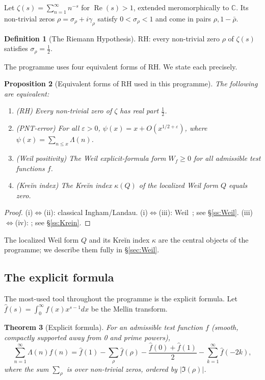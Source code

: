 \documentclass[11pt]{amsart}
\newtheorem{theorem}{Theorem}[section]
\newtheorem{proposition}[theorem]{Proposition}
\theoremstyle{definition}
\newtheorem{definition}[theorem]{Definition}
\theoremstyle{remark}
\newcommand{\RH}{\mathrm{RH}}
\renewcommand{\Re}{\operatorname{Re}}
\newcommand{\half}{\tfrac{1}{2}}
\newcommand{\kap}{\kappa}
\newcommand{\sig}{\sigma}
\newcommand{\gam}{\gamma}
\newcommand{\Lam}{\Lambda}
\newcommand{\eps}{\varepsilon}
\begin{document}
Let $\zeta(s) = \sum_{n=1}^\infty n^{-s}$ for $\Re(s)>1$, extended meromorphically to
$\mathbb{C}$.  Its non-trivial zeros $\rho = \sig_\rho + i\gam_\rho$ satisfy
$0 < \sig_\rho < 1$ and come in pairs $\rho, 1-\bar\rho$.

\begin{definition}[The Riemann Hypothesis]
$\RH$: every non-trivial zero $\rho$ of $\zeta(s)$ satisfies $\sig_\rho = \half$.
\end{definition}

The programme uses four equivalent forms of RH.  We state each precisely.

\begin{proposition}[Equivalent forms of RH used in this programme]
\label{prop:RH-equiv}
The following are equivalent:
\begin{enumerate}[label=\upshape(\roman*)]
  \item \textup{(RH)} Every non-trivial zero of $\zeta$ has real part $\half$.
  \item \textup{(PNT-error)} For all $\eps>0$,
    $\psi(x) = x + O(x^{1/2+\eps})$, where $\psi(x)=\sum_{n\le x}\Lam(n)$.
  \item \textup{(Weil positivity)} The Weil explicit-formula form $W_f \ge 0$ for
    all admissible test functions $f$.
  \item \textup{(Kreĭn index)} The Kreĭn index $\kap(Q)$ of the localized Weil form
    $Q$ equals zero.
\end{enumerate}
\end{proposition}

\begin{proof}
(i)$\Leftrightarrow$(ii): classical Ingham/Landau.
(i)$\Leftrightarrow$(iii): Weil~\cite{Weil52}; see \S\ref{ss:Weil}.
(iii)$\Leftrightarrow$(iv): \cite{RP8}; see \S\ref{ss:Krein}.
\end{proof}

The localized Weil form $Q$ and its Kreĭn index $\kap$ are the central objects of the
programme; we describe them fully in \S\ref{sec:Weil}.

\subsection{The explicit formula}
\label{ss:explicit}

The most-used tool throughout the programme is the explicit formula.  Let
$\hat f(s) = \int_0^\infty f(x)x^{s-1}dx$ be the Mellin transform.

\begin{theorem}[Explicit formula]
\label{thm:explicit}
For an admissible test function $f$ (smooth, compactly supported away from 0 and
prime powers),
\begin{equation}
  \label{eq:explicit}
  \sum_{n=1}^\infty \Lam(n)f(n)
  = \hat f(1) - \sum_\rho \hat f(\rho) - \frac{\hat f(0)+\hat f(1)}{2}
  - \sum_{k=1}^\infty \hat f(-2k),
\end{equation}
where the sum $\sum_\rho$ is over non-trivial zeros, ordered by $|\Im(\rho)|$.
\end{theorem}
\end{document}

